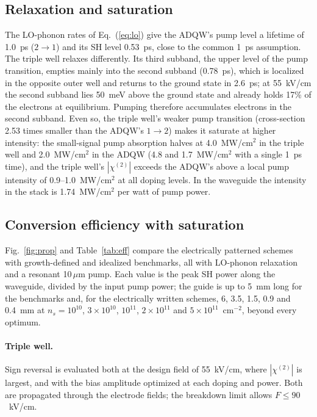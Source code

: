 \documentclass[11pt]{article}
\newcommand{\chitwo}{\chi^{(2)}}
\newcommand{\um}{\,\mu\mathrm{m}}
\begin{document}
\subsection{Relaxation and saturation}
The LO-phonon rates of Eq.~(\ref{eq:lo}) give the ADQW's pump level a lifetime of 1.0~ps ($2\to1$) and its SH level 0.53~ps, close to the common 1~ps assumption. The triple well relaxes differently. Its third subband, the upper level of the pump transition, empties mainly into the second subband (0.78~ps), which is localized in the opposite outer well and returns to the ground state in 2.6~ps; at 55~kV/cm the second subband lies 50~meV above the ground state and already holds 17\% of the electrons at equilibrium. Pumping therefore accumulates electrons in the second subband. Even so, the triple well's weaker pump transition (cross-section 2.53 times smaller than the ADQW's $1\to2$) makes it saturate at higher intensity: the small-signal pump absorption halves at 4.0~MW/cm$^2$ in the triple well and 2.0~MW/cm$^2$ in the ADQW (4.8 and 1.7~MW/cm$^2$ with a single 1~ps time), and the triple well's $|\chitwo|$ exceeds the ADQW's above a local pump intensity of 0.9--1.0~MW/cm$^2$ at all doping levels. In the waveguide the intensity in the stack is 1.74~MW/cm$^2$ per watt of pump power.

\subsection{Conversion efficiency with saturation}\label{sec:eff}
Fig.~\ref{fig:prop} and Table~\ref{tab:eff} compare the electrically patterned schemes with growth-defined and idealized benchmarks, all with LO-phonon relaxation and a resonant 10$\um$ pump. Each value is the peak SH power along the waveguide, divided by the input pump power; the guide is up to 5~mm long for the benchmarks and, for the electrically written schemes, 6, 3.5, 1.5, 0.9 and 0.4~mm at $n_s=10^{10}$, $3\times10^{10}$, $10^{11}$, $2\times10^{11}$ and $5\times10^{11}$~cm$^{-2}$, beyond every optimum.

\paragraph{Triple well.} Sign reversal is evaluated both at the design field of 55~kV/cm, where $|\chitwo|$ is largest, and with the bias amplitude optimized at each doping and power. Both are propagated through the electrode fields; the breakdown limit allows $F\le90$~kV/cm.
\end{document}
